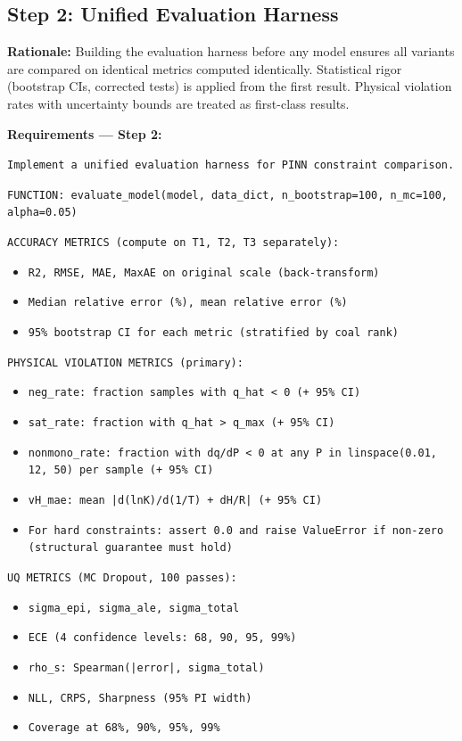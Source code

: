 \documentclass[12pt,a4paper]{article}
\begin{document}
\subsection{Step 2: Unified Evaluation Harness}

\begin{rationalebox}
\textbf{Rationale:} Building the evaluation harness before any model
ensures all variants are compared on identical metrics computed
identically. Statistical rigor (bootstrap CIs, corrected tests) is
applied from the first result. Physical violation rates with uncertainty
bounds are treated as first-class results.
\end{rationalebox}

\begin{promptbox}
\textbf{Requirements --- Step 2:}

\texttt{Implement a unified evaluation harness for PINN constraint
comparison.}

\texttt{FUNCTION: evaluate\_model(model, data\_dict, n\_bootstrap=100,
n\_mc=100, alpha=0.05)}

\texttt{ACCURACY METRICS (compute on T1, T2, T3 separately):}
\begin{itemize}[noitemsep]
  \item \texttt{R2, RMSE, MAE, MaxAE on original scale (back-transform)}
  \item \texttt{Median relative error (\%), mean relative error (\%)}
  \item \texttt{95\% bootstrap CI for each metric (stratified by coal rank)}
\end{itemize}

\texttt{PHYSICAL VIOLATION METRICS (primary):}
\begin{itemize}[noitemsep]
  \item \texttt{neg\_rate: fraction samples with q\_hat < 0 (+ 95\% CI)}
  \item \texttt{sat\_rate: fraction with q\_hat > q\_max (+ 95\% CI)}
  \item \texttt{nonmono\_rate: fraction with dq/dP < 0 at any P in
    linspace(0.01, 12, 50) per sample (+ 95\% CI)}
  \item \texttt{vH\_mae: mean |d(lnK)/d(1/T) + dH/R| (+ 95\% CI)}
  \item \texttt{For hard constraints: assert 0.0 and raise ValueError
    if non-zero (structural guarantee must hold)}
\end{itemize}

\texttt{UQ METRICS (MC Dropout, 100 passes):}
\begin{itemize}[noitemsep]
  \item \texttt{sigma\_epi, sigma\_ale, sigma\_total}
  \item \texttt{ECE (4 confidence levels: 68, 90, 95, 99\%)}
  \item \texttt{rho\_s: Spearman(|error|, sigma\_total)}
  \item \texttt{NLL, CRPS, Sharpness (95\% PI width)}
  \item \texttt{Coverage at 68\%, 90\%, 95\%, 99\%}
\end{itemize}


\end{promptbox}
\end{document}

